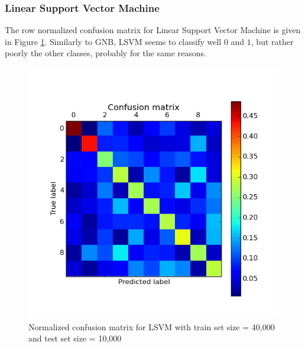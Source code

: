 \documentclass{acm_proc_article-sp}
\begin{document}
\subsubsection{Linear Support Vector Machine }
The row normalized confusion matrix for Linear Support Vector Machine is given in Figure \ref{fig:lsvm_conf}. Similarly to GNB, LSVM seems to classify well $0$ and $1$, but rather poorly the other classes, probably for the same reasons. 
\begin{figure} 
\centering
\includegraphics[width=0.9\columnwidth]{graphs/svm_conf.png}  
\caption{ Normalized confusion matrix for LSVM with train set size = 40,000 and test set size = 10,000}
\label{fig:lsvm_conf}
\end{figure}
\end{document}
